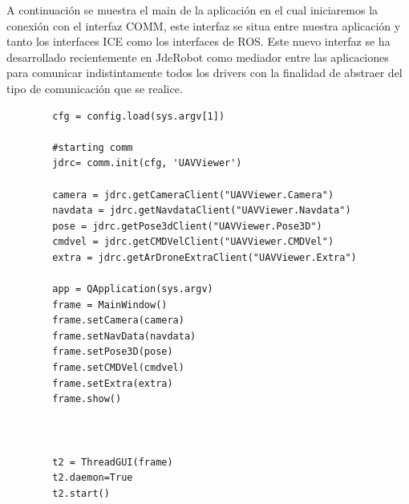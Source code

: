 A continuación se muestra el main de la aplicación en el cual iniciaremos la conexión con el interfaz COMM, este interfaz se situa entre nuestra aplicación y tanto los interfaces ICE como los interfaces de ROS. Este nuevo interfaz se ha desarrollado recientemente en JdeRobot como mediador entre las aplicaciones para comunicar indistintamente todos los drivers con la finalidad de abstraer del tipo de comunicación que se realice.

{\scriptsize
\begin{verbatim}
        cfg = config.load(sys.argv[1])

        #starting comm
        jdrc= comm.init(cfg, 'UAVViewer')

        camera = jdrc.getCameraClient("UAVViewer.Camera")
        navdata = jdrc.getNavdataClient("UAVViewer.Navdata")
        pose = jdrc.getPose3dClient("UAVViewer.Pose3D")
        cmdvel = jdrc.getCMDVelClient("UAVViewer.CMDVel")
        extra = jdrc.getArDroneExtraClient("UAVViewer.Extra")

        app = QApplication(sys.argv)
        frame = MainWindow()
        frame.setCamera(camera)
        frame.setNavData(navdata)
        frame.setPose3D(pose)
        frame.setCMDVel(cmdvel)
        frame.setExtra(extra)
        frame.show()



        t2 = ThreadGUI(frame)
        t2.daemon=True
        t2.start()
\end{verbatim}}
